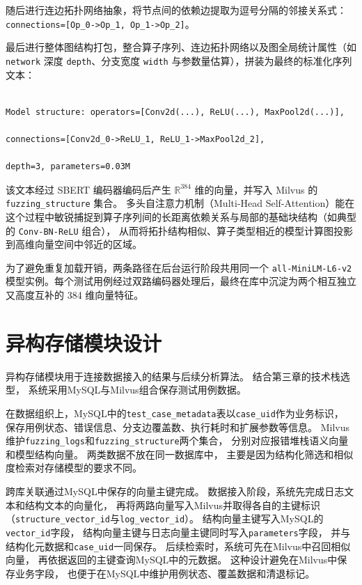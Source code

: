 随后进行连边拓扑网络抽象，将节点间的依赖边提取为逗号分隔的邻接关系式：\texttt{connections=[Op\_0->Op\_1,}\allowbreak\texttt{ Op\_1->Op\_2]}。

最后进行整体图结构打包，整合算子序列、连边拓扑网络以及图全局统计属性（如 \texttt{network} 深度 \texttt{depth}、分支宽度 \texttt{width} 与参数量估算），拼装为最终的标准化序列文本：

\begin{verbatim}

Model structure: operators=[Conv2d(...), ReLU(...), MaxPool2d(...)], 

connections=[Conv2d_0->ReLU_1, ReLU_1->MaxPool2d_2], 

depth=3, parameters=0.03M

\end{verbatim}



该文本经过 SBERT 编码器编码后产生 $\mathbb{R}^{384}$ 维的向量，并写入 Milvus 的 \texttt{fuzzing\_structure} 集合。
多头自注意力机制（Multi-Head Self-Attention）能在这个过程中敏锐捕捉到算子序列间的长距离依赖关系与局部的基础块结构（如典型的 \texttt{Conv-BN-ReLU} 组合），
从而将拓扑结构相似、算子类型相近的模型计算图投影到高维向量空间中邻近的区域。



为了避免重复加载开销，两条路径在后台运行阶段共用同一个 \texttt{all-MiniLM-L6-v2} 模型实例。每个测试用例经过双路编码器处理后，最终在库中沉淀为两个相互独立又高度互补的 384 维向量特征。



\section{异构存储模块设计}

异构存储模块用于连接数据接入的结果与后续分析算法。
结合第三章的技术栈选型，
系统采用MySQL与Milvus组合保存测试用例数据。

在数据组织上，MySQL中的\texttt{test\_case\_metadata}表以\texttt{case\_uid}作为业务标识，
保存用例状态、错误信息、分支边覆盖数、执行耗时和扩展参数等信息。
Milvus维护\texttt{fuzzing\_logs}和\texttt{fuzzing\_structure}两个集合，
分别对应报错堆栈语义向量和模型结构向量。
两类数据不放在同一数据库中，
主要是因为结构化筛选和相似度检索对存储模型的要求不同。

跨库关联通过MySQL中保存的向量主键完成。
数据接入阶段，系统先完成日志文本和结构文本的向量化，
再将两路向量写入Milvus并取得各自的主键标识
（\texttt{structure\_vector\_id}与\texttt{log\_vector\_id}）。
结构向量主键写入MySQL的\texttt{vector\_id}字段，
结构向量主键与日志向量主键同时写入\texttt{parameters}字段，
并与结构化元数据和\texttt{case\_uid}一同保存。
后续检索时，系统可先在Milvus中召回相似向量，
再依据返回的主键查询MySQL中的元数据。
这种设计避免在Milvus中保存业务字段，
也便于在MySQL中维护用例状态、覆盖数据和清退标记。

